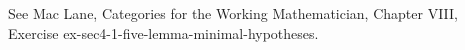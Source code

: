See Mac Lane, Categories for the Working Mathematician, Chapter VIII, Exercise ex-sec4-1-five-lemma-minimal-hypotheses.
